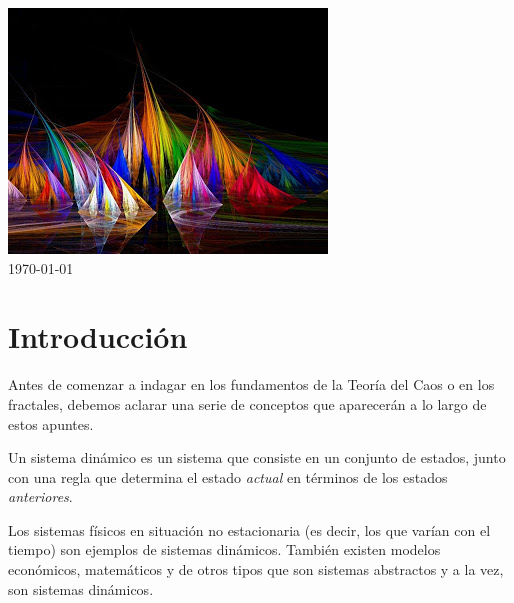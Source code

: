 \begin{titlepage}

\includegraphics{img/Logo.jpg}\\ %


{\large \today}\\[1cm] %



\vfill %

\end{titlepage}
\tableofcontents
\newpage

\section{Introducción}
Antes de comenzar a indagar en los fundamentos de la Teoría del Caos o en los fractales, debemos aclarar una serie de conceptos que aparecerán a lo largo de estos apuntes.

\begin{definition}\label{def:sistemaDinamico}
Un sistema dinámico es un sistema que consiste en un conjunto de estados, junto con una regla que determina el estado \emph{actual} en términos de los estados \emph{anteriores}.
\end{definition}

Los sistemas físicos en situación no estacionaria (es decir, los que varían con el tiempo) son ejemplos de sistemas dinámicos. También existen modelos económicos, matemáticos y de otros tipos que son sistemas abstractos y a la vez, son sistemas dinámicos.

